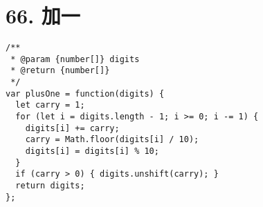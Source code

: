 \newpage
\section{66. 加一}
\label{leetcode:66}

\begin{verbatim}
/**
 * @param {number[]} digits
 * @return {number[]}
 */
var plusOne = function(digits) {
  let carry = 1;
  for (let i = digits.length - 1; i >= 0; i -= 1) {
    digits[i] += carry;
    carry = Math.floor(digits[i] / 10);
    digits[i] = digits[i] % 10;
  }
  if (carry > 0) { digits.unshift(carry); }
  return digits;
};
\end{verbatim}
